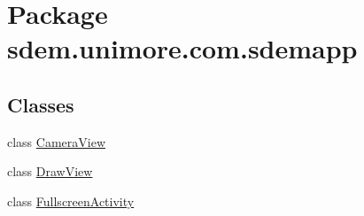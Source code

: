 \hypertarget{namespacesdem_1_1unimore_1_1com_1_1sdemapp}{\section{Package sdem.\+unimore.\+com.\+sdemapp}
\label{namespacesdem_1_1unimore_1_1com_1_1sdemapp}
}
\subsection*{Classes}
\begin{DoxyCompactItemize}
\item 
class \hyperlink{classsdem_1_1unimore_1_1com_1_1sdemapp_1_1_camera_view}{Camera\+View}
\item 
class \hyperlink{classsdem_1_1unimore_1_1com_1_1sdemapp_1_1_draw_view}{Draw\+View}
\item 
class \hyperlink{classsdem_1_1unimore_1_1com_1_1sdemapp_1_1_fullscreen_activity}{Fullscreen\+Activity}
\end{DoxyCompactItemize}

